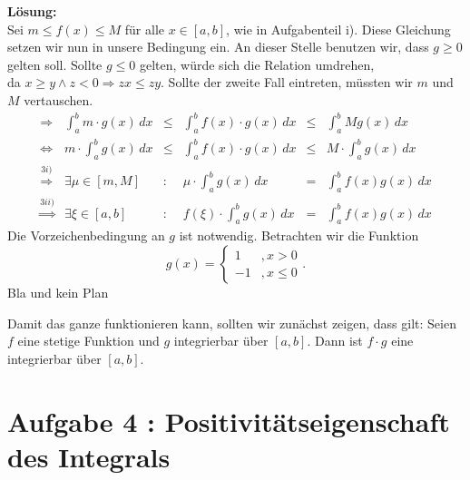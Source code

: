 \documentclass[11pt,a4paper,ngerman]{article}
\begin{document}
\begin{enumerate}[i)]
\textbf{Lösung:}\\
Sei $m \leq f(x) \leq M$ für alle $x \in [a,b]$, wie in Aufgabenteil i). Diese Gleichung setzen wir nun in unsere Bedingung ein. An dieser Stelle benutzen wir, dass $g\geq0$ gelten soll. Sollte $g\leq 0$ gelten, würde sich die Relation umdrehen, \\da $x\geq y \land z<0 \Rightarrow zx \leq zy$. Sollte der zweite Fall eintreten, müssten wir $m$ und $M$ vertauschen.\\
$$
\begin{array}{crcccl}
\Rightarrow& \int_a^b m\cdot g(x) \, dx& \leq & \int_a^b f(x) \cdot g(x) \, dx & \leq & \int_a^b M g(x) \, dx\\
\Leftrightarrow & m \cdot \int_a^b g(x) \, dx & \leq & \int_a^b f(x) \cdot g(x) \, dx & \leq & M \cdot \int_a^b g(x) \, dx\\
\stackrel{3i)}{\Rightarrow} & \exists \mu \in [m,M]&:& \mu \cdot \int_a^b g(x) \, dx & = & \int_a^b f(x)g(x) \, dx \\
\stackrel{3ii)}{\Rightarrow} & \exists \xi \in [a,b] &:& f(\xi) \cdot \int_a^b g(x) \, dx &=& \int_a^b f(x)g(x) \, dx
\end{array}
$$
Die Vorzeichenbedingung an $g$ ist notwendig. Betrachten wir die Funktion
$$
g(x) = \left\{
\begin{array}{lr}
1&,x>0\\
-1&,x\leq0
\end{array}
\right. .
$$
Bla und kein Plan

Damit das ganze funktionieren kann, sollten wir zunächst zeigen, dass gilt:
Seien $f$ eine stetige Funktion und $g$ integrierbar über $[a,b]$.  Dann ist $f\cdot g$ eine integrierbar über $[a,b]$.
\end{enumerate}


\section*{Aufgabe 4 : \mdseries Positivitätseigenschaft des Integrals}
\end{document}

